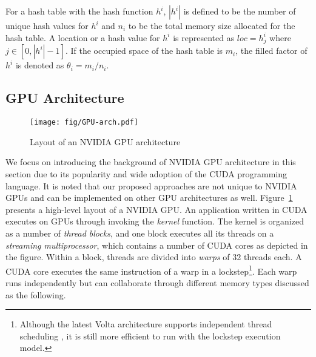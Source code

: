 For a hash table with the hash function $h^i$, $|h^i|$ is defined to be the number of unique hash values for $h^i$ and $n_i$ to be the total memory size allocated for the hash table.
A location or a hash value for $h^i$ is represented as $loc = h^i_j$ where $j \in [0,|h^i|-1]$.
If the occupied space of the hash table is $m_i$, the filled factor of $h^i$ is denoted as $\theta_i = m_i / n_i$.

\subsection{GPU Architecture}

\begin{figure}[t]
	\centering
	\texttt{[image: fig/GPU-arch.pdf]}
	\caption{Layout of an NVIDIA GPU architecture}
	\label{fig:arch}
\end{figure}

We focus on introducing the background of NVIDIA GPU architecture in this section due to its popularity and wide adoption of the CUDA programming language. 
It is noted that our proposed approaches are not unique to NVIDIA GPUs and can be implemented on other GPU architectures as well. Figure~\ref{fig:arch} presents a high-level layout of a NVIDIA GPU. An application written in CUDA executes on GPUs through invoking the \emph{kernel} function. The kernel is organized as a number of \emph{thread blocks}, and one block executes all its threads on a \emph{streaming multiprocessor}, which contains a number of CUDA cores as depicted in the figure. Within a block, threads are divided into \emph{warps} of 32 threads each. 
A CUDA core executes the same instruction of a warp in a lockstep\footnote{Although the latest Volta architecture supports independent thread scheduling \cite{},
	it is still more efficient to run with the lockstep execution model.}.
Each warp runs independently but can collaborate through different memory types discussed as the following.  


